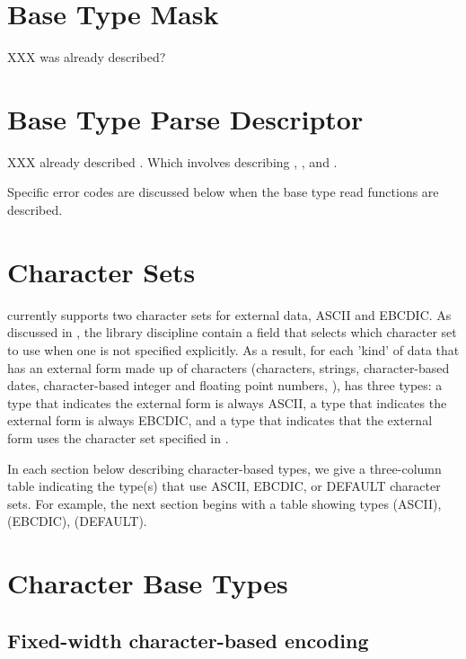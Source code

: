 \section{Base Type Mask}
\label{sec:base-type-mask}

XXX \PDCbasem{} was already described?

\section{Base Type Parse Descriptor}
\label{sec:base-type-parse-descriptors}

XXX already described \PDCbasepd{}.  Which involves describing \PDCloct{}, \PDCpost{},
and \PDCerrCodet{}.  

Specific error codes are discussed below
when the base type read functions are described.

\section{Character Sets}

\PADSL{} currently supports two character sets for external data, ASCII and EBCDIC.
As discussed in , the library
discipline contain a field
 that selects which character set to use when
one is not specified explicitly.  As a result, for each 'kind' of data
that has an external form made up of characters (characters, strings,
character-based dates, character-based integer and floating point
numbers, \etc{}), \PADSL{} has three types: a type that indicates the external
form is always ASCII, a type that indicates the external form is
always EBCDIC, and a type that indicates that the external form uses
the character set specified in .

In each section below describing character-based types, we give a
three-column table indicating the type(s) that use ASCII, EBCDIC, or
DEFAULT character sets.  For example, the next section begins with a
table showing types  (ASCII),  (EBCDIC), 
(DEFAULT).

\section{Character Base Types}

\subsection{Fixed-width character-based encoding}

